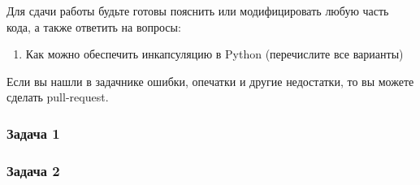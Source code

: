 Для сдачи работы будьте готовы пояснить или модифицировать любую часть кода, а также ответить на вопросы:

\begin{enumerate}
    \item Как можно обеспечить инкапсуляцию в Python (перечислите все варианты)
\end{enumerate}

Если вы нашли в задачнике ошибки, опечатки и другие недостатки, то вы можете сделать pull-request.  

\subsubsection{Задача 1}



\subsubsection{Задача 2}


